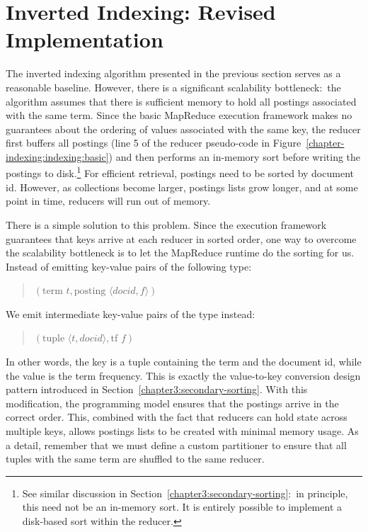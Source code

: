 \section{Inverted Indexing: Revised Implementation}
\label{chapter-indexing:index:revised}

The inverted indexing algorithm presented in the previous section
serves as a reasonable baseline.  However, there is a significant
scalability bottleneck:\ the algorithm assumes that there is
sufficient memory to hold all postings associated with the same term.
Since the basic MapReduce execution framework makes no guarantees
about the ordering of values associated with the same key, the reducer
first buffers all postings (line 5 of the reducer pseudo-code in
Figure~\ref{chapter-indexing:indexing:basic}) and then performs an
in-memory sort before writing the postings to disk.\footnote{See
  similar discussion in Section~\ref{chapter3:secondary-sorting}:\ in
  principle, this need not be an in-memory sort.  It is entirely
  possible to implement a disk-based sort within the reducer.}  For
efficient retrieval, postings need to be sorted by document id.
However, as collections become larger, postings lists grow longer, and
at some point in time, reducers will run out of memory.

There is a simple solution to this problem.  Since the execution
framework guarantees that keys arrive at each reducer in sorted order,
one way to overcome the scalability bottleneck is to let the MapReduce
runtime do the sorting for us.  Instead of emitting key-value pairs of
the following type:

\begin{quote}
$(\textrm{term }t, \textrm{posting }\langle docid, f \rangle )$
\end{quote}

\noindent We emit intermediate key-value pairs of the type instead:

\begin{quote}
$(\textrm{tuple }\langle t, docid \rangle, \textrm{tf }f )$
\end{quote}

\noindent In other words, the key is a tuple containing the term and
the document id, while the value is the term frequency.  This is
exactly the value-to-key conversion design pattern introduced in
Section~\ref{chapter3:secondary-sorting}.  With this modification, the
programming model ensures that the postings arrive in the correct
order.  This, combined with the fact that reducers can hold state
across multiple keys, allows postings lists to be created with minimal
memory usage.  As a detail, remember that we must define a custom
partitioner to ensure that all tuples with the same term are shuffled
to the same reducer.


